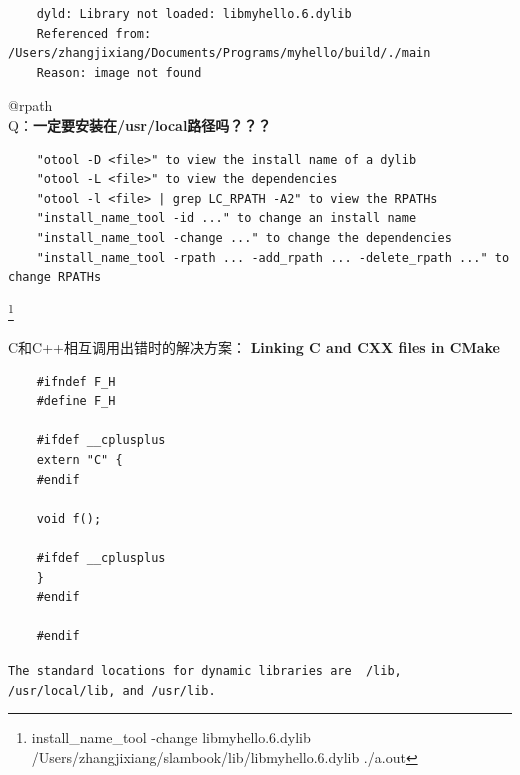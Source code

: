 \documentclass[12pt,a4paper]{ctexart}
\begin{document}
\begin{enumerate}
	\begin{verbatim}
	dyld: Library not loaded: libmyhello.6.dylib
	Referenced from: /Users/zhangjixiang/Documents/Programs/myhello/build/./main
	Reason: image not found
	\end{verbatim}
	{ @rpath}\\
	Q：\textbf{一定要安装在/usr/local路径吗？？？}\\
	\begin{verbatim}
	"otool -D <file>" to view the install name of a dylib
	"otool -L <file>" to view the dependencies
	"otool -l <file> | grep LC_RPATH -A2" to view the RPATHs
	"install_name_tool -id ..." to change an install name
	"install_name_tool -change ..." to change the dependencies
	"install_name_tool -rpath ... -add_rpath ... -delete_rpath ..." to change RPATHs
	\end{verbatim}
	\footnote{install\_name\_tool -change libmyhello.6.dylib /Users/zhangjixiang/slambook/lib/libmyhello.6.dylib ./a.out}
	
	{ C和C++相互调用出错时的解决方案：}
	\textbf{Linking C and CXX files in CMake}
	\begin{verbatim}
	#ifndef F_H
	#define F_H
	
	#ifdef __cplusplus
	extern "C" {
	#endif
	
	void f();
	
	#ifdef __cplusplus
	}
	#endif
	
	#endif
	\end{verbatim}
	
	{ \texttt{The standard locations for dynamic libraries are ~/lib, /usr/local/lib, and /usr/lib.}}
	

\end{enumerate}
\end{document}
